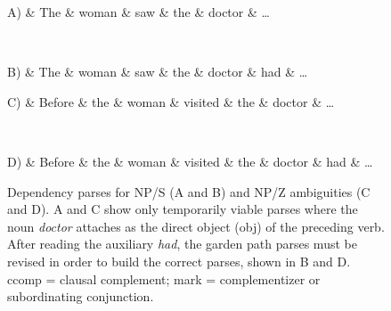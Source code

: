 \documentclass[a4paper, 12pt]{article}
\begin{document}
\begin{figure}[htbp]
\begin{dependency}[theme=simple, font=\normalsize, label style={font=\normalsize}]
\begin{deptext}[column sep=1em]
    A) \&  The \& woman \& saw \& the \& doctor \& \dots \\
\end{deptext}
\end{dependency}
\\
\begin{dependency}[theme=simple, font=\normalsize, label style={font=\normalsize}]
\begin{deptext}[column sep=1em]
    B) \&  The \& woman \& saw \& the \& doctor \& had \& \dots \\
\end{deptext}
\end{dependency}

\begin{dependency}[theme=simple, font=\normalsize, label style={font=\normalsize}]
\begin{deptext}[column sep=1em]
    C) \& Before \&  the \& woman \& visited \& the \& doctor \& \dots \\
\end{deptext}
\end{dependency}
\\
\begin{dependency}[theme=simple, font=\normalsize, label style={font=\normalsize}]
\begin{deptext}[column sep=1em]
    D) \& Before \&  the \& woman \& visited \& the \& doctor \& had \& \dots \\
\end{deptext}
\end{dependency}
\caption{Dependency parses for NP/S (A and B) and NP/Z ambiguities (C and
    D). A and C show only temporarily viable parses where the noun
    \emph{doctor} attaches as the direct object (obj) of the preceding verb.
    After reading the auxiliary \emph{had}, the garden path parses must be
    revised in order to build the correct parses, shown in B and D. ccomp =
    clausal complement; mark = complementizer or subordinating
    conjunction.}\label{fig:gpresolve}
\end{figure}
\end{document}
